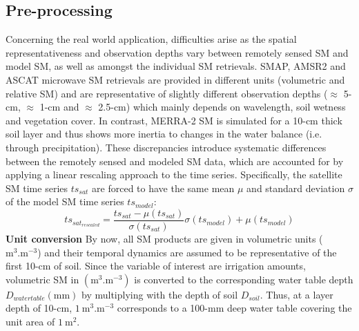 \documentclass[hess, manuscript]{copernicus}
\begin{document}
\subsection{Pre-processing}
Concerning the real world application, difficulties arise as the spatial representativeness and observation depths vary between remotely sensed SM and model SM, as well as amongst the individual SM retrievals. SMAP, AMSR2 and ASCAT microwave SM retrievals are provided in different units (volumetric and relative SM) and are representative of slightly different observation depths ($\approx$ 5-cm, $\approx$ 1-cm and $\approx$ 2.5-cm) which mainly depends on wavelength, soil wetness and vegetation cover. In contrast, MERRA-2 SM is simulated for a 10-cm thick soil layer \citep{bosilovich2015merra} and thus shows more inertia to changes in the water balance (i.e. through precipitation). These discrepancies introduce systematic differences between the remotely sensed and modeled SM data, which are accounted for by applying a linear rescaling approach \citep{draper2009evaluation,brocca2010spatial,brocca2013scaling} to the time series. Specifically, the satellite SM time series $ts_{sat}$ are forced to have the same mean $\mu$ and standard deviation $\sigma$ of the model SM time series $ts_{model}$:
%
\begin{equation} 
\label{eq:scaling}
ts_{sat_{rescaled}} = \frac{ts_{sat} - \mu(ts_{sat})}{\sigma(ts_{sat})} \sigma(ts_{model}) + \mu(ts_{model})
\end{equation}
%
\textbf{Unit conversion}
By now, all SM products are given in volumetric units ($\si{\m^{3}.\m^{-3}}$) and their temporal dynamics are assumed to be representative of the first 10-cm of soil. Since the variable of interest are irrigation amounts, volumetric SM in $(\si{\m^{3}.\m^{-3}})$ is converted to the corresponding water table depth $D_{watertable} (\si{\mm})$ by multiplying with the depth of soil $D_{soil}$. Thus, at a layer depth of 10-cm, $1~\si{\m^{3}.\m^{-3}}$ corresponds to a 100-mm deep water table covering the unit area of $1~\si{\m^{2}}$.\\
\end{document}
